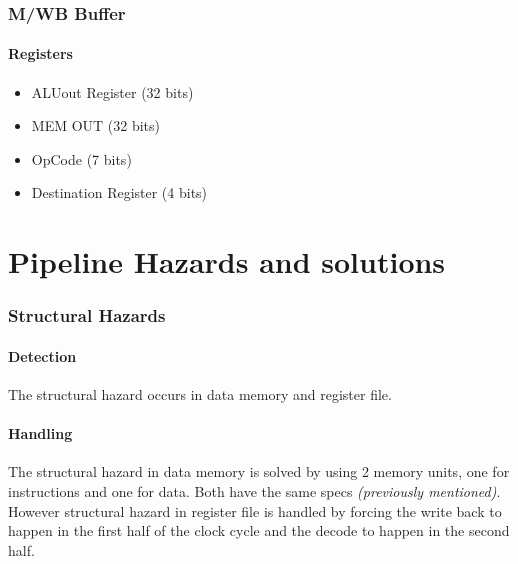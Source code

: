 \documentclass[12pt]{report}
\begin{document}
\section{M/WB Buffer}

\subsection{Registers}
\begin{itemize}
    \item ALUout Register (32 bits)
    \item MEM OUT (32 bits)
    \item OpCode (7 bits)
    \item Destination Register (4 bits)
\end{itemize}

\part{Pipeline Hazards and solutions}

\section{Structural Hazards}

\subsection{Detection}
The structural hazard occurs in data memory and register file.

\subsection{Handling}
The structural hazard in data memory is solved by using 2 memory units, one for instructions and one for data. Both have the same specs \emph{(previously mentioned)}. \\
However structural hazard in register file is handled by forcing the write back to happen in the first half of the clock cycle and the decode to happen in the second half.
\end{document}
